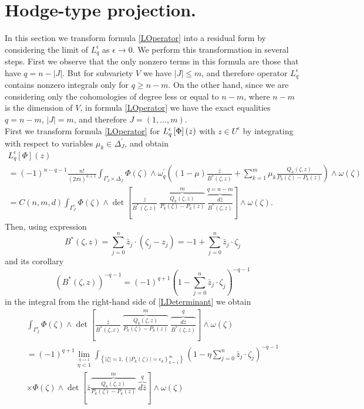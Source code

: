 \documentclass[11pt,reqno]{amsart}
\numberwithin{equation}{section}
\begin{document}
\section{Hodge-type projection.}
\label{LTransformation}

\indent
In this section we transform formula \eqref{LOperator} into a residual form by considering
the limit of $L_q^{\epsilon}$ as $\epsilon\to 0$.
We perform this transformation in several steps. First we observe that the only nonzero terms in this
formula are those that have $q=n-|J|$. But for subvariety $V$ we have $|J|\leq m$,
and therefore operator $L_q^{\epsilon}$ contains nonzero integrals only for $q\geq n-m$.
On the other hand, since we are considering only the cohomologies of degree less
or equal to $n-m$, where $n-m$ is the dimension of $V$, in formula \eqref{LOperator}
we have the exact equalities $q=n-m$, $|J|=m$, and therefore $J=(1,\dots,m)$.\\
\indent
First we transform formula \eqref{LOperator} for
${{\displaystyle} L_q^{\epsilon}\left[\Phi\right](z) }$ with $z\in U^{\epsilon}$
by integrating with respect to variables $\mu_k \in \Delta^{\prime}_J$, and obtain
\begin{multline}\label{LDeterminant}
L_q^{\epsilon}\left[\Phi\right](z)\\
=(-1)^{n-q-1}\frac{n!}{(2\pi i)^{n+1}}\int_{\Gamma^{\epsilon}_J\times\Delta^{\prime}_J}
\Phi(\zeta)\wedge\omega^{\prime}_q\left((1-\mu)\frac{\bar z}
{B^*(\zeta,z)}+\sum_{k=1}^m\mu_k\frac{Q_k(\zeta,z)}
{P_k(\zeta)-P_k(z)}\right)\wedge\omega(\zeta)\\
=C(n,m,d)\int_{\Gamma^{\epsilon}_J}\Phi(\zeta)
\wedge\det\left[\frac{\bar z}{B^*(\zeta,z)}\
\overbrace{\frac{Q_k(\zeta,z)}{P_k(\zeta)-P_k(z)}}^m\
\overbrace{\frac{d{\bar z}}{B^*(\zeta,z)}}^{q=n-m}\right]
\wedge\omega(\zeta).
\end{multline}
\indent
Then, using expression
$$B^*(\zeta,z)=\sum_{j=0}^n{\bar z}_j\cdot\left(\zeta_j-z_j\right)
=-1+\sum_{j=0}^n{\bar z}_j\cdot\zeta_j$$
and its corollary
$$\left(B^*(\zeta,z)\right)^{-q-1}=(-1)^{q+1}
\left(1-\sum_{j=0}^n{\bar z}_j\cdot\zeta_j\right)^{-q-1}$$
in the integral from the right-hand side of \eqref{LDeterminant} we obtain
\begin{multline*}
\int_{\Gamma^{\epsilon}_J}\Phi(\zeta)
\wedge\det\left[\frac{\bar z}{B^*(\zeta,z)}\
\overbrace{\frac{Q_k(\zeta,z)}{P_k(\zeta)-P_k(z)}}^m\
\overbrace{\frac{d{\bar z}}{B^*(\zeta,z)}}^{q}\right]
\wedge\omega(\zeta)\\
=(-1)^{q+1}\lim_{\stackrel{\eta\to 1}{\eta<1}}
\int_{\left\{|\zeta|=1,\left\{|P_k(\zeta)|=\epsilon_k\right\}_{k=1}^m\right\}}
\left(1-\eta\sum_{j=0}^n{\bar z}_j\cdot\zeta_j\right)^{-q-1}\\
\times\Phi(\zeta)\wedge\det\left[{\bar z}\overbrace{\frac{Q_k(\zeta,z)}
{P_k(\zeta)-P_k(z)}}^m\
\overbrace{d{\bar z}}^{q}\right]\wedge\omega(\zeta)
\end{multline*}
\end{document}
